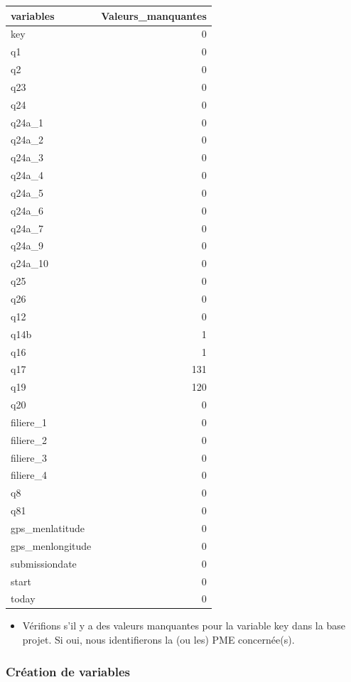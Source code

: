\documentclass[
]{article}
\providecommand{\tightlist}{%
  \setlength{\itemsep}{0pt}\setlength{\parskip}{0pt}}
\begin{document}
\begin{longtable}{lr}
\toprule
variables & Valeurs\_manquantes \\ 
\midrule
key & 0 \\ 
q1 & 0 \\ 
q2 & 0 \\ 
q23 & 0 \\ 
q24 & 0 \\ 
q24a\_1 & 0 \\ 
q24a\_2 & 0 \\ 
q24a\_3 & 0 \\ 
q24a\_4 & 0 \\ 
q24a\_5 & 0 \\ 
q24a\_6 & 0 \\ 
q24a\_7 & 0 \\ 
q24a\_9 & 0 \\ 
q24a\_10 & 0 \\ 
q25 & 0 \\ 
q26 & 0 \\ 
q12 & 0 \\ 
q14b & 1 \\ 
q16 & 1 \\ 
q17 & 131 \\ 
q19 & 120 \\ 
q20 & 0 \\ 
filiere\_1 & 0 \\ 
filiere\_2 & 0 \\ 
filiere\_3 & 0 \\ 
filiere\_4 & 0 \\ 
q8 & 0 \\ 
q81 & 0 \\ 
gps\_menlatitude & 0 \\ 
gps\_menlongitude & 0 \\ 
submissiondate & 0 \\ 
start & 0 \\ 
today & 0 \\ 
\bottomrule
\end{longtable}

\begin{itemize}
\tightlist
\item
  Vérifions s'il y a des valeurs manquantes pour la variable key dans la
  base projet. Si oui, nous identifierons la (ou les) PME concernée(s).
\end{itemize}

\hypertarget{cruxe9ation-de-variables}{%
\subsubsection{Création de variables}\label{cruxe9ation-de-variables}}
\end{document}
